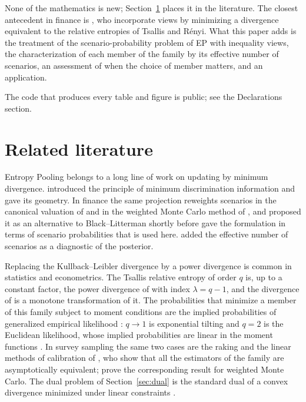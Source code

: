 \documentclass[11pt]{article}
\begin{document}
None of the mathematics is new; Section~\ref{sec:literature} places it in
the literature. The closest antecedent in finance is \citet{DeyJuneja2012},
who incorporate views by minimizing a divergence equivalent to the relative
entropies of Tsallis and R\'enyi. What this paper adds is the treatment of
the scenario-probability problem of EP with inequality views, the
characterization of each member of the family by its effective number of
scenarios, an assessment of when the choice of member matters, and an
application.

The code that produces every table and figure is public; see the
Declarations section.

\section{Related literature}\label{sec:literature}

Entropy Pooling belongs to a long line of work on updating by minimum
divergence. \citet{Kullback1959} introduced the principle of minimum
discrimination information and \citet{Csiszar1975} gave its geometry. In
finance the same projection reweights scenarios in the canonical valuation
of \citet{Stutzer1996} and in the weighted Monte Carlo method of
\citet{AvellanedaEtAl2001}, and \citet{Pezier2007} proposed it as an
alternative to Black--Litterman shortly before \citet{Meucci2008} gave the
formulation in terms of scenario probabilities that is used here.
\citet{Meucci2012} added the effective number of scenarios as a diagnostic
of the posterior.

Replacing the Kullback--Leibler divergence by a power divergence is common
in statistics and econometrics. The Tsallis relative entropy of order $q$
is, up to a constant factor, the power divergence of
\citet{CressieRead1984} with index $\lambda = q-1$, and the divergence of
\citet{Renyi1961} is a monotone transformation of it. The probabilities
that minimize a member of this family subject to moment conditions are the
implied probabilities of generalized empirical likelihood
\citep{NeweySmith2004}: $q \to 1$ is exponential tilting
\citep{KitamuraStutzer1997,ImbensSpadyJohnson1998} and $q=2$ is the
Euclidean likelihood, whose implied probabilities are linear in the moment
functions \citep{AntoineBonnalRenault2007}. In survey sampling the same two
cases are the raking and the linear methods of calibration of
\citet{DevilleSarndal1992}, who show that all the estimators of the family
are asymptotically equivalent; \citet{GlassermanYu2005} prove the
corresponding result for weighted Monte Carlo. The dual problem of
Section~\ref{sec:dual} is the standard dual of a convex divergence
minimized under linear constraints \citep{BorweinLewis1991}.
\end{document}
